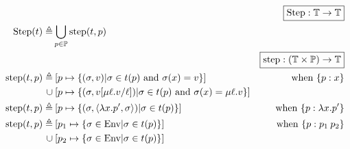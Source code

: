 \documentclass{article}
\begin{document}
\begin{align*}
	                           &                                                                                                                                                                                                                         & \fbox{$\Step:\mathbb{T}\rightarrow\mathbb{T}$}                   \\
	\Step(\ptree)   \triangleq & \bigcup_{p\in\mathbb{P}}\step(\ptree,p)                                                                                                                                                                                                                                                    \\
	                           &                                                                                                                                                                                                                         & \fbox{$\step:(\mathbb{T}\times\mathbb{P})\rightarrow\mathbb{T}$} \\
	\step(\ptree,p) \triangleq & \: [p\mapsto\{(\ctx,v)|\ctx\in\ptree(p)\text{ and }\ctx(x)=v\}]                                                                                                                                                         & \text{when }\plabel{p}{x}                                        \\
	\cup                       & \: [p\mapsto\{(\ctx,v[\mu\ell.v/\ell])|\ctx\in \ptree(p)\text{ and }\ctx(x)=\mu\ell.v\}]                                                                                                                                                                                                   \\
	\step(\ptree,p) \triangleq & \: [p\mapsto\{(\ctx,\langle\lambda x.p',\ctx\rangle)|\ctx\in \ptree(p)\}]                                                                                                                                               & \text{when }\plabel{p}{\lambda x.p'}                             \\
	\step(\ptree,p) \triangleq & \: [p_1\mapsto\{\ctx\in\Ctx|\ctx\in \ptree(p)\}]                                                                                                                                                                        & \text{when }\plabel{p}{p_1\:p_2}                                 \\
	\cup                       & \: [p_2\mapsto\{\ctx\in\Ctx|\ctx\in \ptree(p)\}]                                                                                                                                                                                                                                           \\

\end{align*}
\end{document}
